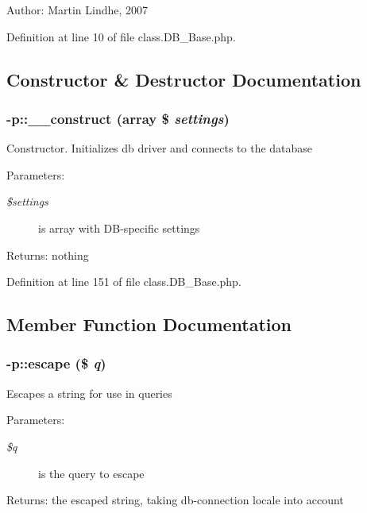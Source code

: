 \begin{Desc}
\item[Author:]Martin Lindhe, 2007 \end{Desc}


Definition at line 10 of file class.DB\_\-Base.php.

\subsection{Constructor \& Destructor Documentation}
\subsubsection{-p::\_\-\_\-construct (array \$ {\em settings})}\label{protocolDB__Base-p_de3b9ab3b03feb729f1c39da40e2da79}


Constructor. Initializes db driver and connects to the database \begin{Desc}
\item[Parameters:]
\begin{description}
\item[{\em \$settings}]is array with DB-specific settings \end{description}
\end{Desc}
\begin{Desc}
\item[Returns:]nothing \end{Desc}


Definition at line 151 of file class.DB\_\-Base.php.

\subsection{Member Function Documentation}
\subsubsection{-p::escape (\$ {\em q})\hspace{0.3cm}{\tt  [abstract]}}\label{protocolDB__Base-p_1abb04e278dfa25cb1fd6d00be4eccf6}


Escapes a string for use in queries \begin{Desc}
\item[Parameters:]
\begin{description}
\item[{\em \$q}]is the query to escape \end{description}
\end{Desc}
\begin{Desc}
\item[Returns:]the escaped string, taking db-connection locale into account \end{Desc}
